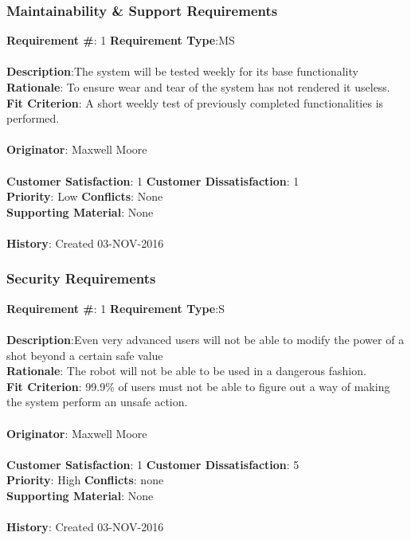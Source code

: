 \documentclass[titlepage]{article}
\begin{document}
\subsubsection{Maintainability \& Support Requirements}
\begin{framed}
	\noindent\textbf{Requirement \#}: 1 \hfill \textbf{Requirement Type}:MS \hfill\\\\
	\noindent\textbf{Description}:The system will be tested weekly for its base functionality\\
	\textbf{Rationale}: To ensure wear and tear of the system has not rendered it useless.\\
	\textbf{Fit Criterion}: A short weekly test of previously completed functionalities is performed.\\\\
	\textbf{Originator}: Maxwell Moore\\\\
	\noindent\textbf{Customer Satisfaction}: 1 \hfill 	\textbf{Customer Dissatisfaction}: 1 \hfill\\
	\textbf{Priority}: Low \hfill \textbf{Conflicts}: None \hfill\\
	\textbf{Supporting Material}: None\\\\
	\noindent\textbf{History}: Created 03-NOV-2016
\end{framed}

\subsubsection{Security Requirements}
\begin{framed}
	\noindent\textbf{Requirement \#}: 1 \hfill \textbf{Requirement Type}:S \hfill\\\\
	\noindent\textbf{Description}:Even very advanced users will not be able to modify the power of a shot beyond a certain safe value\\
	\textbf{Rationale}: The robot will not be able to be used in a dangerous fashion.\\
	\textbf{Fit Criterion}: 99.9\% of users must not be able to figure out a way of making the system perform an unsafe action.\\\\
	\textbf{Originator}: Maxwell Moore\\\\
	\noindent\textbf{Customer Satisfaction}: 1 \hfill 	\textbf{Customer Dissatisfaction}: 5 \hfill\\
	\textbf{Priority}: High \hfill \textbf{Conflicts}: none \hfill\\
	\textbf{Supporting Material}: None\\\\
	\noindent\textbf{History}: Created 03-NOV-2016
\end{framed}
\end{document}
